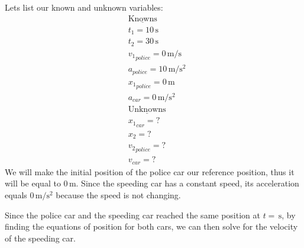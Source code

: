 \documentclass{article}
\begin{document}
	Lets list our known and unknown variables:
	\begin{align*}
		&\mathrm{\underline{Knowns}}\\
		&t_1 =10\,\mathrm{s} \\
		&t_2 = 30\,\mathrm{s} \\
		&{v_1}_{police} =0\,\mathrm{m/s} \\
		&a_{police} =10\,\mathrm{m/s^2}\\
		&{x_1}_{police} = 0\,\mathrm{m}\\
		&a_{car} =0\,\mathrm{m/s^2}\\
		&\mathrm{\underline{Unknowns}}\\
		&{x_1}_{car} = ?\\
		&x_2 = ?\\
		&{v_2}_{police} = ?\\
		&{v}_{car} = ?
	\end{align*}
	We will make the initial position of the police car our reference position, thus it will
	be equal to $0\,\mathrm{m}$. Since the speeding car has a constant speed, its acceleration
	equals $0\,\mathrm{m/s^2}$ because the speed is not changing.

	Since the police car and the speeding car reached the same position at $t=\,\mathrm{s}$,
	by finding the equations of position for both cars, we can then solve for the velocity of
	the speeding car.
\end{document}
